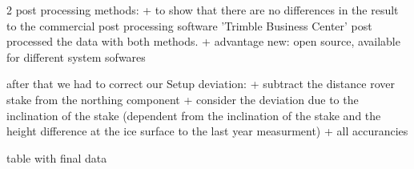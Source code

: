 
2 post processing methods:
+ to show that there are no differences in the result to the commercial post processing software 'Trimble Business Center' post processed the data with both methods.
+ advantage new: open source, available for different system sofwares

after that we had to correct our Setup deviation:
+ subtract the distance rover stake from the northing component
+ consider the deviation due to the inclination of the stake (dependent from the inclination of the stake and the height difference at the ice surface to the last year measurment)
+ all accurancies

table with final data
